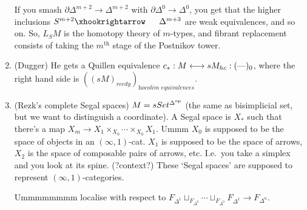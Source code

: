 \documentclass[11pt]{article}
\begin{document}
\begin{AlexandreBousfieldLocalisation}
\begin{PartTwo}
\begin{enumerate}
If you smash $\partial\Delta^{m+2}\to \Delta^{m+2}$ with $\partial\Delta^0\to\Delta^0$, you get that the higher inclusions $S^{m+2}\cofibration \Delta^{m+3}$ are weak equivalences, and so on. So, $L_SM$ is the homotopy theory of $m$-types, and fibrant replacement consists of taking the $m^\text{th}$ stage of the Postnikov tower.
\item (Dugger) He gets a Quillen equivalence $c_*:M\longleftrightarrow sM_{hc}:(\textup{---})_0$, where the right hand side is $((sM)_{reedy})_{\textit{hocolim equivalences}}$.
\item (Rezk's complete Segal spaces) $M=sSet^{\Delta^{\textup{op}}}$ (the same as bisimplicial set, but we want to distinguish a coordinate). A Segal space is $X_*$ such that there's a map $X_m\to X_1\times_{X_0}\cdots\times_{X_0}X_1$. Ummm $X_0$ is supposed to be the space of objects in an $(\infty,1)$-cat. $X_1$ is supposed to be the space of arrows, $X_2$ is the space of composable pairs of arrows, etc. I.e.\ you take a simplex and you look at its spine. (?context?) These `Segal spaces' are supposed to represent $(\infty,1)$-categories.

Ummmmmmmm localise with respect to $F_{\Delta^1}\sqcup_{F_{\Delta^0}}\cdots\sqcup_{F_{\Delta^0}}F_{\Delta^1}\to F_{\Delta^n}$.
\end{enumerate}
\end{PartTwo}
\pagebreak
\end{AlexandreBousfieldLocalisation}
\end{document}
